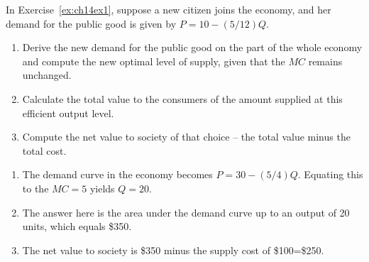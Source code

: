 \begin{enumialphparenastyle}
\begin{ex}
\begin{sol}
\begin{center}
\end{center}
\end{sol}
\end{ex}

\begin{ex}\label{ex:ch14ex2}
In Exercise~\ref{ex:ch14ex1}, suppose a new citizen joins the economy, and her demand for the public good is given by $P=10-(5/12)Q$.
\begin{enumerate}
	\item	Derive the new demand for the public good on the part of the whole economy and compute the new optimal level of supply, given that the $MC$ remains unchanged.
	\item	Calculate the total value to the consumers of the amount supplied at this efficient output level. 
	\item	Compute the net value to society of that choice -- the total value minus the total cost.
\end{enumerate}
\begin{sol}
\begin{enumerate}
	\item	The demand curve in the economy becomes $P=30-(5/4)Q$. Equating this to the $MC=5$ yields $Q=20$.
	\item	The answer here is the area under the demand curve up to an output of 20 units, which equals \$350.
	\item	The net value to society is \$350 minus the supply cost of \$100=\$250.
\end{enumerate}	
\end{sol}
\end{ex}


\end{enumialphparenastyle}
